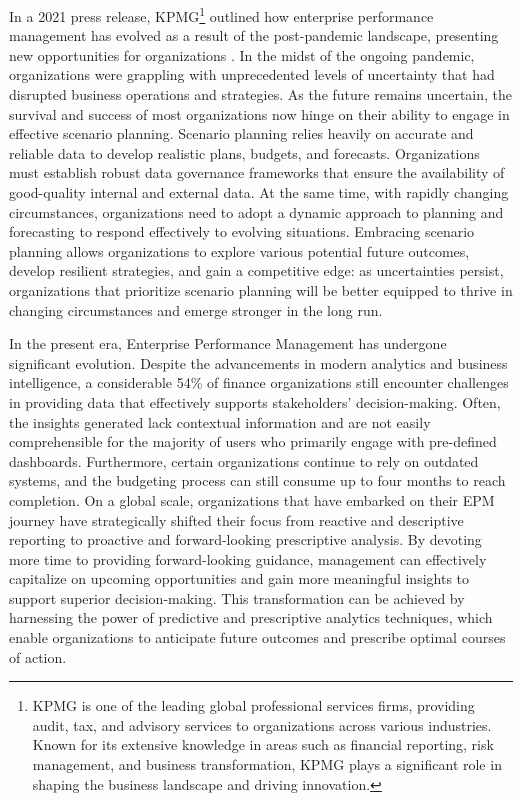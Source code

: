 \documentclass[12pt,a4paper,openright,twoside]{book}
\begin{document}
In a 2021 press release, KPMG\footnote{KPMG is one of the leading global professional services firms, providing audit, tax, and advisory services to organizations across various industries. Known for its extensive knowledge in areas such as financial reporting, risk management, and business transformation, KPMG plays a significant role in shaping the business landscape and driving innovation.} outlined how enterprise performance management has evolved as a result of the post-pandemic landscape, presenting new opportunities for organizations \cite{kpmg2021evolution}.
%
In the midst of the ongoing pandemic, organizations were grappling with unprecedented levels of uncertainty that had disrupted business operations and strategies. 
%
As the future remains uncertain, the survival and success of most organizations now hinge on their ability to engage in effective scenario planning.
%
Scenario planning relies heavily on accurate and reliable data to develop realistic plans, budgets, and forecasts. 
%
Organizations must establish robust data governance frameworks that ensure the availability of good-quality internal and external data. 
%
At the same time, with rapidly changing circumstances, organizations need to adopt a dynamic approach to planning and forecasting to respond effectively to evolving situations. 
%
Embracing scenario planning allows organizations to explore various potential future outcomes, develop resilient strategies, and gain a competitive edge: as uncertainties persist, organizations that prioritize scenario planning will be better equipped to thrive in changing circumstances and emerge stronger in the long run.

In the present era, Enterprise Performance Management has undergone significant evolution. 
%
Despite the advancements in modern analytics and business intelligence, a considerable 54\% of finance organizations still encounter challenges in providing data that effectively supports stakeholders' decision-making. \cite{gartner2021report}
%
Often, the insights generated lack contextual information and are not easily comprehensible for the majority of users who primarily engage with pre-defined dashboards. 
%
Furthermore, certain organizations continue to rely on outdated systems, and the budgeting process can still consume up to four months to reach completion.
%
On a global scale, organizations that have embarked on their EPM journey have strategically shifted their focus from reactive and descriptive reporting to proactive and forward-looking prescriptive analysis. 
%
By devoting more time to providing forward-looking guidance, management can effectively capitalize on upcoming opportunities and gain more meaningful insights to support superior decision-making. 
%
This transformation can be achieved by harnessing the power of predictive and prescriptive analytics techniques, which enable organizations to anticipate future outcomes and prescribe optimal courses of action.
\end{document}
